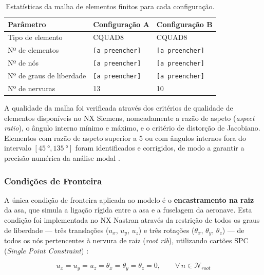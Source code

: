 \documentclass[a4paper,fleqn,noprintline]{cas-dc}
\begin{document}
\begin{table}[h!]
\centering
\caption{Estatísticas da malha de elementos finitos para cada 
configuração.}
\label{tab:malha_stats}
\renewcommand{\arraystretch}{1.4}
\begin{tabularx}{\textwidth}{p{4.5cm} X X}
\toprule
\textbf{Parâmetro} & \textbf{Configuração A} & 
\textbf{Configuração B} \\
\midrule
Tipo de elemento        & CQUAD8    & CQUAD8 \\
Nº de elementos         & \texttt{[a preencher]}  
                        & \texttt{[a preencher]} \\
Nº de nós               & \texttt{[a preencher]}  
                        & \texttt{[a preencher]} \\
Nº de graus de liberdade & \texttt{[a preencher]} 
                        & \texttt{[a preencher]} \\
Nº de nervuras          & 13        & 10 \\
\bottomrule
\end{tabularx}
\end{table}

A qualidade da malha foi verificada através dos critérios de qualidade de elementos disponíveis no NX Siemens, nomeadamente a razão de aspeto (\textit{aspect ratio}), o ângulo interno mínimo e máximo, e o critério de distorção de Jacobiano. Elementos com razão de aspeto superior a 5 ou com ângulos internos fora do intervalo $[\qty{45}{\degree}, \qty{135}{\degree}]$ foram identificados e corrigidos, de modo a garantir a precisão numérica da análise modal \cite{Bathe2014, Cook2001}.

\subsubsection{Condições de Fronteira}

A única condição de fronteira aplicada ao modelo é o \textbf{encastramento na raiz} da asa, que simula a ligação rígida entre a asa e a fuselagem da aeronave. Esta condição foi implementada no NX Nastran através da restrição de todos os graus de liberdade --- três translações ($u_x$, $u_y$, $u_z$) e três rotações ($\theta_x$, $\theta_y$, $\theta_z$) --- de todos os nós pertencentes à nervura de raiz (\textit{root rib}), utilizando cartões SPC (\textit{Single Point Constraint}) \cite{Nastran2014}:

\begin{equation}
    u_x = u_y = u_z = \theta_x = \theta_y = \theta_z = 0, 
    \qquad \forall \, n \in \mathcal{N}_{root}
    \label{eq:spc}
\end{equation}
\end{document}
